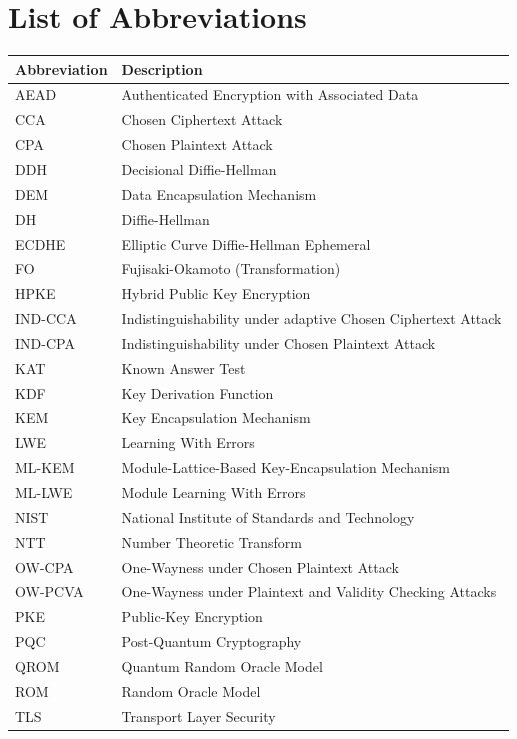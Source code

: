 \chapter{List of Abbreviations}

\begin{longtable}{l l}
\toprule
\textbf{Abbreviation} & \textbf{Description} \\
\midrule
\endhead

AEAD    & Authenticated Encryption with Associated Data \\
CCA     & Chosen Ciphertext Attack \\
CPA     & Chosen Plaintext Attack \\
DDH     & Decisional Diffie-Hellman \\
DEM     & Data Encapsulation Mechanism \\
DH      & Diffie-Hellman \\
ECDHE   & Elliptic Curve Diffie-Hellman Ephemeral \\
FO      & Fujisaki-Okamoto (Transformation) \\
HPKE    & Hybrid Public Key Encryption \\
IND-CCA & Indistinguishability under adaptive Chosen Ciphertext Attack \\
IND-CPA & Indistinguishability under Chosen Plaintext Attack \\
KAT     & Known Answer Test \\
KDF     & Key Derivation Function \\
KEM     & Key Encapsulation Mechanism \\
LWE     & Learning With Errors \\
ML-KEM  & Module-Lattice-Based Key-Encapsulation Mechanism \\
ML-LWE  & Module Learning With Errors \\
NIST    & National Institute of Standards and Technology \\
NTT     & Number Theoretic Transform \\
OW-CPA  & One-Wayness under Chosen Plaintext Attack \\
OW-PCVA & One-Wayness under Plaintext and Validity Checking Attacks \\
PKE     & Public-Key Encryption \\
PQC     & Post-Quantum Cryptography \\
QROM    & Quantum Random Oracle Model \\
ROM     & Random Oracle Model \\
TLS     & Transport Layer Security \\

\bottomrule
\end{longtable}